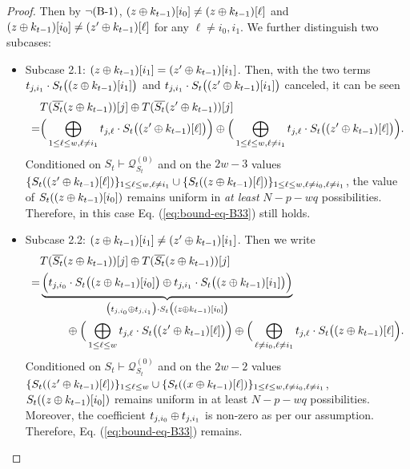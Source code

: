 \begin{proof}
	Then by $\neg\text{(B-1)}$, $(z\oplus k_{t-1})[i_0]\neq(z\oplus k_{t-1})[\ell]$ and $(z\oplus k_{t-1})[i_0]\neq(z'\oplus k_{t-1})[\ell]$ for any $\ell\neq i_0,i_1$. We further distinguish two subcases:
	\begin{itemize}
		\item Subcase 2.1: $(z\oplus k_{t-1})[i_1]=(z'\oplus k_{t-1})[i_1]$. Then, with the two terms $t_{j,i_1}\cdot S_t\big((z\oplus k_{t-1})[i_1]\big)$ and $t_{j,i_1}\cdot S_t\big((z'\oplus k_{t-1})[i_1]\big)$ canceled, it can be seen
		\begin{align*}
		&  T(\overline{S_t}(z\oplus k_{t-1}))[j]\oplus T(\overline{S_t}(z'\oplus k_{t-1}))[j]       \\
		= &
		\Big(\bigoplus_{1\leq\ell\leq w,\ell\neq i_1}t_{j,\ell}\cdot S_t\big((z'\oplus k_{t-1})[\ell]\big)\Big)\oplus
		\Big(\bigoplus_{1\leq\ell\leq w,\ell\neq i_1}t_{j,\ell}\cdot S_t\big((z'\oplus k_{t-1})[\ell]\big)\Big)   .
		\end{align*}
		Conditioned on $S_t\vdash\mathcal{Q}_{S_t}^{(0)}$ and on the $2w-3$ values $\{S_t((z'\oplus k_{t-1})[\ell])\}_{1\leq \ell\leq w,\ell\neq i_1}\cup\{S_t((z\oplus k_{t-1})[\ell])\}_{1\leq \ell\leq w,\ell\neq i_0,\ell\neq i_1}$, the value of $S_t((z\oplus k_{t-1})[i_0])$ remains uniform in {\it at least} $N-p-wq$ possibilities. Therefore, in this case Eq. (\ref{eq:bound-eq-B33}) still holds.
		\item Subcase 2.2: $(z\oplus k_{t-1})[i_1]\neq(z'\oplus k_{t-1})[i_1]$. Then we write
		\begin{align*}
		&  T(\overline{S_t}(z\oplus k_{t-1}))[j]\oplus T(\overline{S_t}(z\oplus k_{t-1}))[j]       \\
		= &   \underbrace{\Big(t_{j,i_0}\cdot S_t\big((z\oplus k_{t-1})[i_0]\big)
			\oplus
			t_{j,i_1}\cdot S_t\big((z\oplus k_{t-1})[i_1]\big)\Big)}_{\big(t_{j,i_0}\oplus t_{j,i_1}\big)\cdot S_t\big((z\oplus k_{t-1})[i_0]\big)}   	\\
		&\ \ \ \ \ \ \ \oplus
		\Big(\bigoplus_{1\leq\ell\leq w}t_{j,\ell}\cdot S_t\big((z'\oplus k_{t-1})[\ell]\big)\Big)    \oplus
		\Big(\bigoplus_{\ell\neq i_0,\ell\neq i_1}t_{j,\ell}\cdot S_t\big((z\oplus k_{t-1})[\ell]\Big).
		\end{align*}
		Conditioned on $S_t\vdash\mathcal{Q}_{S_t}^{(0)}$ and on the $2w-2$ values $\{S_t((z'\oplus k_{t-1})[\ell])\}_{1\leq \ell\leq w}\cup\{S_t((x\oplus k_{t-1})[\ell])\}_{1\leq \ell\leq w,\ell\neq i_0,\ell\neq i_1}$, $S_t((z\oplus k_{t-1})[i_0])$ remains uniform in at least $N-p-wq$ possibilities. Moreover, the coefficient $t_{j,i_0}\oplus t_{j,i_1}$ is non-zero as per our assumption. Therefore, Eq. (\ref{eq:bound-eq-B33}) remains.
	\end{itemize}
	

\end{proof}
